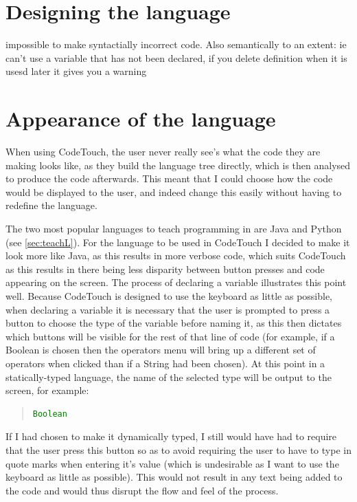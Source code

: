 \documentclass[ %
                    author={Jonathan Rankin},
                supervisor={Dr. David May, Dr. Ian Holyer},
                    degree={MEng},
                     title={CodeTouch},
                  subtitle={A Revolutionary Way To Program Real Code On Touch Screen Devices},
                      type={enterprise},
                      year={2015 } ]{dissertation}
\begin{document}
\section{Designing the language}

impossible to make syntactially incorrect code. Also semantically to an extent: ie can't use a variable that has not been declared, if you delete definition when it is usesd later it gives you a warning

\section{Appearance of the language}
When using CodeTouch, the user never really see's what the code they are making looks like, as they build the language tree directly, which is then analysed to produce the code afterwards. This meant that I could choose how the code would be displayed to the user, and indeed change this easily without having to redefine the language. 

The two most popular languages to teach programming in are Java and Python (see \ref{sec:teachL}). For the language to be used in CodeTouch I decided to make it look more like Java, as this results in more verbose code, which suits CodeTouch as this results in there being less disparity between button presses and code appearing on the screen. The process of declaring a variable illustrates this point well. Because CodeTouch is designed to use the keyboard as little as possible, when declaring a variable it is necessary that the user is prompted to press a button to choose the type of the variable before naming it, as this then dictates which buttons will be visible for the rest of that line of code (for example, if a Boolean is chosen then the operators menu will bring up a different set of operators when clicked than if a String had been chosen). At this point in a statically-typed language, the name of the selected type will be output to the screen, for example:

\begin{quote}
\begin{lstlisting}[caption={Output when Boolean type is selected for variable declaration in Java},label={lst:javaDec},language=Java]
Boolean
\end{lstlisting}
\label{lst:label}
\end{quote}

If I had chosen to make it dynamically typed, I still would have had to require that the user press this button so as to avoid requiring the user to have to type in quote marks when entering it's value (which is undesirable as I want to use the keyboard as little as possible). This would not result in any text being added to the code and would thus disrupt the flow and feel of the process. 
\end{document}
